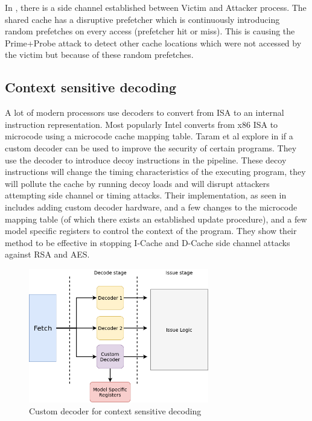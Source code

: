 In , there is a side channel established
between Victim and Attacker process. The shared cache has a disruptive
prefetcher which is continuously introducing random prefetches on every access
(prefetcher hit or miss). This is causing the Prime+Probe attack to detect
other cache locations which  were not accessed by the victim but because of
these random prefetches.

\subsection{Context sensitive decoding}

A lot of modern processors use decoders to convert from ISA to an internal
instruction representation. Most popularly Intel converts from x86 ISA to
microcode using a microcode cache mapping table. Taram et al explore in
 if a custom decoder can be used to improve the security of
certain programs. They use the decoder to introduce decoy instructions in the
pipeline. These decoy instructions will change the timing characteristics of
the executing program, they will pollute the cache by running decoy loads and
will disrupt attackers attempting side channel or timing attacks. Their
implementation, as seen in  includes adding custom decoder
hardware, and a few changes to the microcode mapping table (of which there
exists an established update procedure), and a few model specific registers to
control the context of the program. They show their method to be effective in
stopping I-Cache and D-Cache side channel attacks against RSA and AES.

\begin{figure}[hb]
    \centering
    \includegraphics[width=0.7\textwidth]{figures/csd}
    \caption{Custom decoder for context sensitive decoding}
    \label{fig:csd}
\end{figure}

